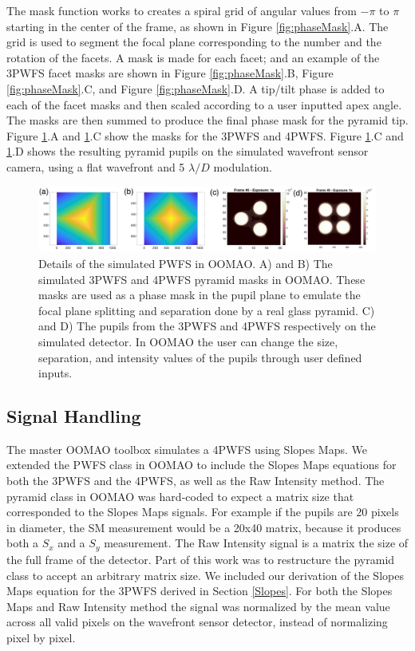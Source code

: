  The mask function works to creates a spiral grid of angular values from $-\pi$ to $\pi$ starting in the center of the frame, as shown in Figure \ref{fig:phaseMask}.A. The grid is used to segment the focal plane corresponding to the number and the rotation of the facets. A mask is made for each facet; and an example of the 3PWFS facet masks are shown in Figure \ref{fig:phaseMask}.B, Figure \ref{fig:phaseMask}.C, and Figure \ref{fig:phaseMask}.D. A tip/tilt phase is added to each of the facet masks and then scaled according to a user inputted apex angle. The masks are then summed to produce the final phase mask for the pyramid tip. Figure \ref{fig:oomaoFigs}.A and \ref{fig:oomaoFigs}.C show the masks for the 3PWFS and 4PWFS. Figure \ref{fig:oomaoFigs}.C and \ref{fig:oomaoFigs}.D shows the resulting pyramid pupils on the simulated wavefront sensor camera, using a flat wavefront and 5 $\lambda/D$ modulation. 

\begin{figure}
    \centering
    \includegraphics[width=1\textwidth]{Chapter Materials/Chapter Four Materials/oomaoFigs.png}
    \caption{Details of the simulated PWFS in OOMAO. A) and B) The simulated 3PWFS and 4PWFS pyramid masks in OOMAO. These masks are used as a phase mask in the pupil plane to emulate the focal plane splitting and separation done by a real glass pyramid. C) and D) The pupils from the 3PWFS and 4PWFS respectively on the simulated detector. In OOMAO the user can change the size, separation, and intensity values of the pupils through user defined inputs.}
    \label{fig:oomaoFigs}
\end{figure}

\subsection{Signal Handling}

The master OOMAO toolbox simulates a 4PWFS using Slopes Maps. We extended the PWFS class in OOMAO to include the Slopes Maps equations for both the 3PWFS and the 4PWFS, as well as the Raw Intensity method. The pyramid class in OOMAO was hard-coded to expect a matrix size that corresponded to the Slopes Maps signals. For example if the pupils are 20 pixels in diameter, the SM measurement would be a 20x40 matrix, because it produces both a $S_x$ and a $S_y$ measurement. The Raw Intensity signal is a matrix the size of the full frame of the detector. Part of this work was to restructure the pyramid class to accept an arbitrary matrix size.  We included our derivation of the Slopes Maps equation for the 3PWFS derived in Section \ref{Slopes}. For both the Slopes Maps and Raw Intensity method the signal was normalized by the mean value across all valid pixels on the wavefront sensor detector, instead of normalizing pixel by pixel. 


